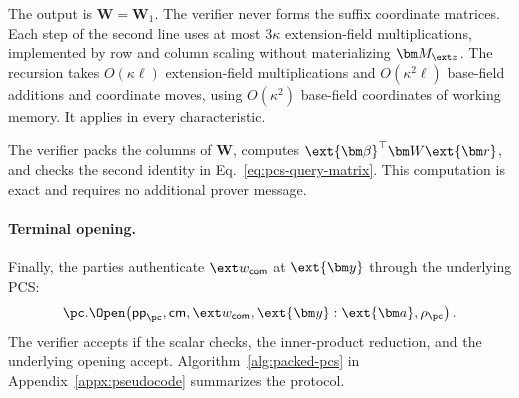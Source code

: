 The output is \(\bm W=\bm W_1\).
The verifier never forms the suffix coordinate matrices.
Each step of the second line uses at most \(3\kappa\)
extension-field multiplications, implemented by row and column
scaling without materializing \(\bm M_{\ext z}\).
The recursion takes \(O(\kappa\ell)\) extension-field
multiplications and \(O(\kappa^2\ell)\) base-field additions and
coordinate moves, using \(O(\kappa^2)\) base-field coordinates
of working memory. It applies in every characteristic.

The verifier packs the columns of \(\bm W\), computes
\(\ext{\bm\beta}^{\top}\bm W\ext{\bm r}\), and checks the second
identity in Eq.~\eqref{eq:pcs-query-matrix}.
This computation is exact and requires no additional prover message.

\paragraph{Terminal opening.}
Finally, the parties authenticate \(\ext w_{\mathsf{com}}\)
at \(\ext{\bm y}\) through the underlying PCS:
\[
    \pc.\Open\!\left(
        \mathsf{pp}_{\pc},\mathsf{cm},
        \ext w_{\mathsf{com}},\ext{\bm y}
        :\ext{\bm a},\rho_{\pc}
    \right).
\]
The verifier accepts if the scalar checks, the inner-product
reduction, and the underlying opening accept.
Algorithm~\ref{alg:packed-pcs} in Appendix~\ref{appx:pseudocode}
summarizes the protocol.

\medskip{}

